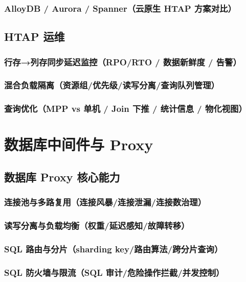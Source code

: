 \documentclass[12pt,UTF8]{ctexbook}
\begin{document}
    \subsection{AlloyDB / Aurora / Spanner（云原生 HTAP 方案对比）}

  \section{HTAP 运维}
    \subsection{行存→列存同步延迟监控（RPO/RTO / 数据新鲜度 / 告警）}
    \subsection{混合负载隔离（资源组/优先级/读写分离/查询队列管理）}
    \subsection{查询优化（MPP vs 单机 / Join 下推 / 统计信息 / 物化视图）}


\chapter{数据库中间件与 Proxy}
\label{chap:db-proxy-middleware}

  \section{数据库 Proxy 核心能力}
    \subsection{连接池与多路复用（连接风暴/连接泄漏/连接数治理）}
    \subsection{读写分离与负载均衡（权重/延迟感知/故障转移）}
    \subsection{SQL 路由与分片（sharding key/路由算法/跨分片查询）}
    \subsection{SQL 防火墙与限流（SQL 审计/危险操作拦截/并发控制）}
\end{document}
